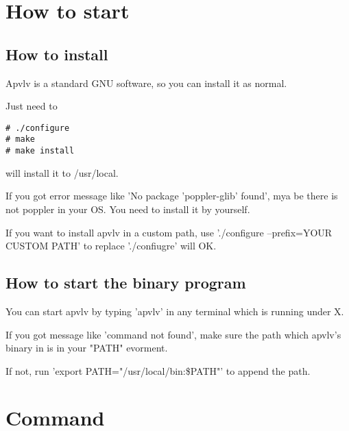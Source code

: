 \documentclass[a4paper,12pt]{article}
\begin{document}
\newpage

\section{How to start}

\subsection{How to install}

Apvlv is a standard GNU software, so you can install it as normal.

Just need to
\begin{verbatim}
# ./configure
# make
# make install
\end{verbatim}
will install it to /usr/local.

If you got error message like 'No package 'poppler-glib' found', mya be there is not poppler in your OS. You need to install it by yourself.

If you want to install apvlv in a custom path, use './configure --prefix=YOUR CUSTOM PATH' to replace './confiugre' will OK.

\subsection{How to start the binary program}

You can start apvlv by typing 'apvlv' in any terminal which is running under X.

If you got message like 'command not found', make sure the path which apvlv's binary in is in your "PATH" evorment. 

If not, run 'export PATH="/usr/local/bin:\$PATH"' to append the path.

\newpage

\section{Command}
\end{document}
